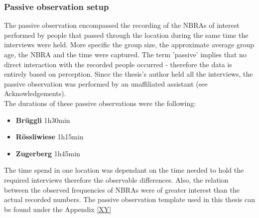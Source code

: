 \subsubsection{Passive observation setup} \label{passive_observation_setup}
The passive observation encompassed the recording of the NBRAs of interest performed by people that passed through the location during the same time the interviews were held. More specific the group size, the approximate average group age, the NBRA and the time were captured. The term 'passive' implies that no direct interaction with the recorded people occurred - therefore the data is entirely based on perception.
Since the thesis's author held all the interviews, the passive observation was performed by an unaffiliated assistant (see Acknowledgements).\\
The durations of these passive observations were the following:
\begin{itemize}
    \item \textbf{Br\"uggli} 1h30min
    \item \textbf{R\"ossliwiese} 1h15min
    \item \textbf{Zugerberg} 1h45min
\end{itemize}
The time spend in one location was dependant on the time needed to hold the required interviews therefore the observable differences. Also, the relation between the observed frequencies of NBRAs were of greater interest than the actual recorded numbers.
The passive observation template used in this thesis can be found under the Appendix \ref{XY}

